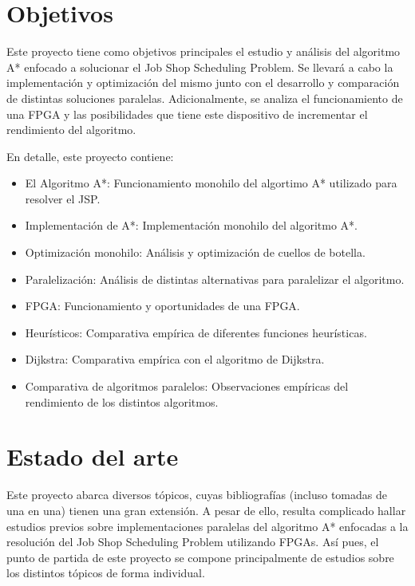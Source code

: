 
\section{Objetivos}

Este proyecto tiene como objetivos principales el estudio y análisis
del algoritmo A* enfocado a solucionar el Job Shop Scheduling Problem.
Se llevará a cabo la implementación y
optimización del mismo junto con el desarrollo y
comparación de distintas soluciones paralelas.
Adicionalmente, se analiza el funcionamiento de una FPGA y
las posibilidades que tiene este dispositivo de incrementar
el rendimiento del algoritmo.

En detalle, este proyecto contiene:
\begin{itemize}[itemsep=0.25px]
    \item El Algoritmo A*: Funcionamiento monohilo del algortimo A* utilizado para resolver el JSP.
    \item Implementación de A*: Implementación monohilo del algoritmo A*.
    \item Optimización monohilo: Análisis y optimización de cuellos de botella.
    \item Paralelización: Análisis de distintas alternativas para paralelizar el algoritmo.
    \item FPGA: Funcionamiento y oportunidades de una FPGA.
    \item Heurísticos: Comparativa empírica de diferentes funciones heurísticas.
    \item Dijkstra: Comparativa empírica con el algoritmo de Dijkstra.
    \item Comparativa de algoritmos paralelos: Observaciones empíricas del rendimiento de los distintos algoritmos.
\end{itemize}

\pagebreak

\section{Estado del arte}

Este proyecto abarca diversos tópicos, cuyas bibliografías
(incluso tomadas de una en una) tienen una gran extensión.
A pesar de ello, resulta complicado hallar estudios previos sobre implementaciones
paralelas del algoritmo A* enfocadas a la resolución del Job Shop Scheduling Problem
utilizando FPGAs.
Así pues, el punto de partida de este proyecto
se compone principalmente de estudios
sobre los distintos tópicos de forma individual.

